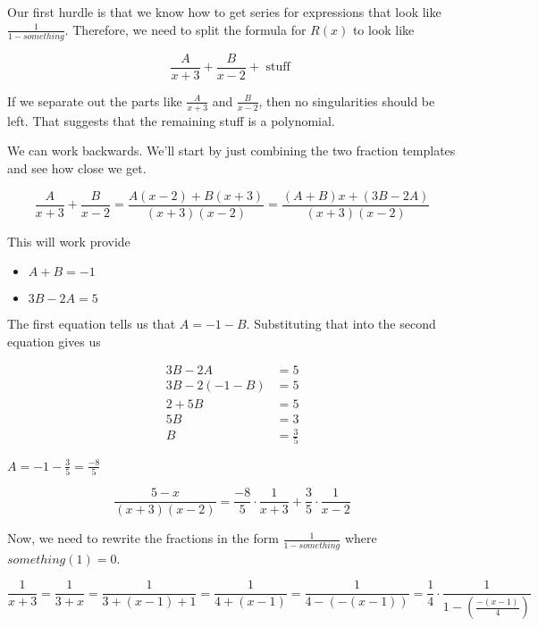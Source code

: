 \documentclass{ximera}
\begin{document}
Our first hurdle is that we know how to get series for expressions that look like $\frac{1}{1-something}$.  Therefore, we need to split the formula for $R(x)$ to look like

\[    \frac{A}{x+3} + \frac{B}{x-2} + \text{ stuff }          \]



If we separate out the parts like $\frac{A}{x+3}$ and $\frac{B}{x-2}$, then no singularities should be left.  That suggests that the remaining stuff is a polynomial.


We can work backwards. We'll start by just combining the two fraction templates and see how close we get.





\[  \frac{A}{x+3} + \frac{B}{x-2}  = \frac{A(x-2) + B(x+3)}{(x+3)(x-2)}  = \frac{(A+B)x + (3B-2A)}{(x+3)(x-2)}       \]


This will work provide

\begin{itemize}
\item $A+B = -1$
\item $3B-2A = 5$
\end{itemize}

The first equation tells us that $A = -1 - B$.  Substituting that into the second equation gives us 


\begin{align*}
3B-2A     & = 5     \\
3B-2(-1 -B)     & = 5     \\
2 + 5B     & = 5     \\
5B     & = 3     \\
B & = \frac{3}{5}
\end{align*}


$A = -1 - \frac{3}{5} = \frac{-8}{5}$



\[ \frac{5-x}{(x+3)(x-2)}     =  \frac{-8}{5} \cdot \frac{1}{x+3} + \frac{3}{5} \cdot \frac{1}{x-2}       \]



Now, we need to rewrite the fractions in the form $\frac{1}{1 - something}$ where   $something(1) = 0$.






\[    \frac{1}{x+3}   = \frac{1}{3+x}  = \frac{1}{3+(x-1)+1}     = \frac{1}{4+(x-1)}     = \frac{1}{4-(-(x-1))}      =   \frac{1}{4} \cdot \frac{1}{1-\left( \frac{-(x-1)}{4} \right) }   \]
\end{document}

